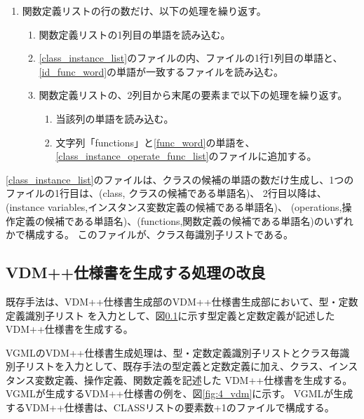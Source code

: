 \begin{enumerate}
\begin{enumerate}
\begin{enumerate}
                \end{enumerate}
        \end{enumerate}
    \item 関数定義リストの行の数だけ、以下の処理を繰り返す。
        \begin{enumerate}
            \item 関数定義リストの1列目の単語を読み込む。
            \label{id_func_word}
            \item \ref{class_instance_list}のファイルの内、ファイルの1行1列目の単語と、\ref{id_func_word}の単語が一致するファイルを読み込む。
            \label{class_instance_operate_func_list}
            \item 関数定義リストの、2列目から末尾の要素まで以下の処理を繰り返す。
                \begin{enumerate}
                    \item 当該列の単語を読み込む。
                    \label{func_word}
                    \item 文字列「functions」と\ref{func_word}の単語を、\ref{class_instance_operate_func_list}のファイルに追加する。
                \end{enumerate}
        \end{enumerate}
\end{enumerate}

\ref{class_instance_list}のファイルは、クラスの候補の単語の数だけ生成し、1つのファイルの1行目は、(class, クラスの候補である単語名)、
2行目以降は、(instance variables,インスタンス変数定義の候補である単語名)、 (operations,操作定義の候補である単語名)、(functions,関数定義の候補である単語名)のいずれかで構成する。
このファイルが、クラス毎識別子リストである。

\subsection{VDM++仕様書を生成する処理の改良}
既存手法は、VDM++仕様書生成部のVDM++仕様書生成部において、型・定数定義識別子リスト
を入力として、図\ref{}に示す型定義と定数定義が記述したVDM++仕様書を生成する。

VGMLのVDM++仕様書生成処理は、型・定数定義識別子リストとクラス毎識別子リストを入力として、既存手法の型定義と定数定義に加え、クラス、インスタンス変数定義、操作定義、関数定義を記述した
VDM++仕様書を生成する。
VGMLが生成するVDM++仕様書の例を、図\ref{fig:4_vdm}に示す。
VGMLが生成するVDM++仕様書は、CLASSリストの要素数+1のファイルで構成する。

